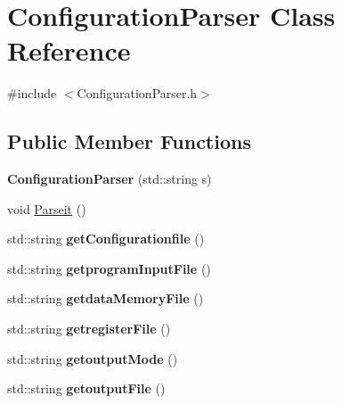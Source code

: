 \hypertarget{class_configuration_parser}{}\section{Configuration\+Parser Class Reference}
\label{class_configuration_parser}


{\ttfamily \#include $<$Configuration\+Parser.\+h$>$}

\subsection*{Public Member Functions}
\begin{DoxyCompactItemize}
\item 
\mbox{\label{class_configuration_parser_a136edf01958c71e82a4336b1271217a0}} 
{\bfseries Configuration\+Parser} (std\+::string s)
\item 
void \mbox{\hyperlink{class_configuration_parser_ae1adbe510f3aa99d3f9c757a423f9a05}{Parseit}} ()
\item 
\mbox{\label{class_configuration_parser_ade42435f4f9ec1a0fc9d3150dc122171}} 
std\+::string {\bfseries get\+Configurationfile} ()
\item 
\mbox{\label{class_configuration_parser_ad1bd1b084e84709b41bda51b9608f4bc}} 
std\+::string {\bfseries getprogram\+Input\+File} ()
\item 
\mbox{\label{class_configuration_parser_a49c65169b8f8627eb43f1a5d1a5d8423}} 
std\+::string {\bfseries getdata\+Memory\+File} ()
\item 
\mbox{\label{class_configuration_parser_a9fcc4b6bb1e5460d8b76bacf3ef214cd}} 
std\+::string {\bfseries getregister\+File} ()
\item 
\mbox{\label{class_configuration_parser_adcbc95b9ab67426605f6dca5ba247622}} 
std\+::string {\bfseries getoutput\+Mode} ()
\item 
\mbox{\label{class_configuration_parser_a6b0393667c3f4fd34eb1645b11da65cc}} 
std\+::string {\bfseries getoutput\+File} ()

\end{DoxyCompactItemize}
